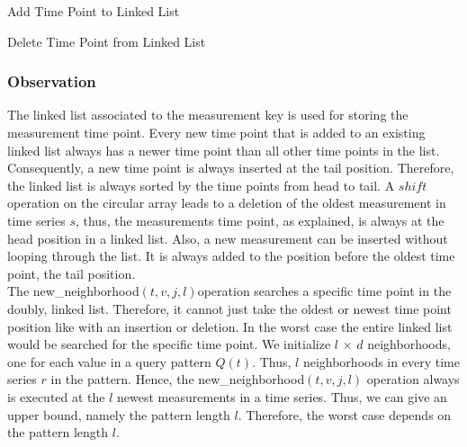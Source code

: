 \documentclass[abstracton,12pt]{scrreprt}
\begin{document}
\begin{algorithm}[H]
	\IncMargin{1em}
	\SetAlgoLined
	\DontPrintSemicolon
	
	\caption{Add Time Point to Linked List}
	\label{AddToList}
\end{algorithm}



\begin{algorithm}[H]
	\IncMargin{1em}
	\DontPrintSemicolon
	

	\caption{Delete Time Point from Linked List}
		\label{deleteListValue}
\end{algorithm}

\subsubsection{Observation}
The linked list associated to the measurement key is used for storing the measurement time point. Every new time point that is added to an existing linked list always has a newer time point than all other time points in the list. Consequently, a new time point is always inserted at the tail position. Therefore, the linked list is always sorted by the time points from head to tail. A $shift$ operation on the circular array leads to a deletion of the oldest measurement in time series $s$, thus, the measurements time point, as explained, is always at the head position in a linked list. Also, a new measurement can be inserted without looping through the list. It is always added to the position before the oldest time point, the tail position. \\
The new\_neighborhood$(t,v,j,l)$operation searches a specific time point in the doubly, linked list. Therefore, it cannot just take the oldest or newest time point position like with an insertion or deletion. In the worst case the entire linked list would be searched for the specific time point. We initialize $l$ $\times$ $d$ neighborhoods, one for each value in a query pattern $Q(t)$. Thus, $l$ neighborhoods in every time series $r$ in the pattern. Hence, the new\_neighborhood$(t,v,j,l)$ operation always is executed at the $l$ newest measurements in a time series. Thus, we can give an upper bound, namely the pattern length $l$. Therefore, the worst case depends on the pattern length $l$. 
\end{document}
